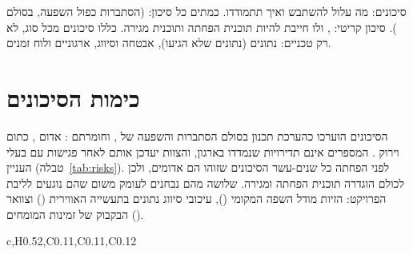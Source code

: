 \begin{pcguide}
סיכונים: מה עלול להשתבש ואיך תתמודדו. כמתים כל סיכון:  (הסתברות כפול השפעה, בסולם ).
סיכון קריטי: , ולו חייבת להיות תוכנית הפחתה ותוכנית מגירה. כללו סיכונים מכל סוג, לא רק טכניים: נתונים (נתונים שלא הגיעו), אבטחה וסיווג, ארגוניים ולוח זמנים.
\end{pcguide}
\section{כימות הסיכונים}\label{sec:riskquant}
הסיכונים הוערכו כהערכת תכנון בסולם הסתברות  והשפעה  של , וחומרתם : אדום , כתום
 וירוק . המספרים אינם תדירויות שנמדדו בארגון, והצוות יעדכן אותם לאחר פגישות עם בעלי העניין
(טבלה~\ref{tab:risks}). לפני הפחתה כל שנים-עשר הסיכונים שזוהו הם אדומים, ולכן לכולם הוגדרה תוכנית הפחתה ומגירה. שלושה מהם נבחנים לעומק משום
שהם נוגעים לליבת הפרויקט: הזיות מודל השפה המקומי (), עיכובי סיווג נתונים בתעשייה האווירית () וצוואר הבקבוק של זמינות המומחים ().
\begin{table}[!htbp]
\centering
\caption{רשימת סיכונים וכימותם: אדום , כתום , ירוק }\label{tab:risks}
\begin{pctable}{c,H{0.52},C{0.11},C{0.11},C{0.12}}
\end{pctable}
\end{table}

